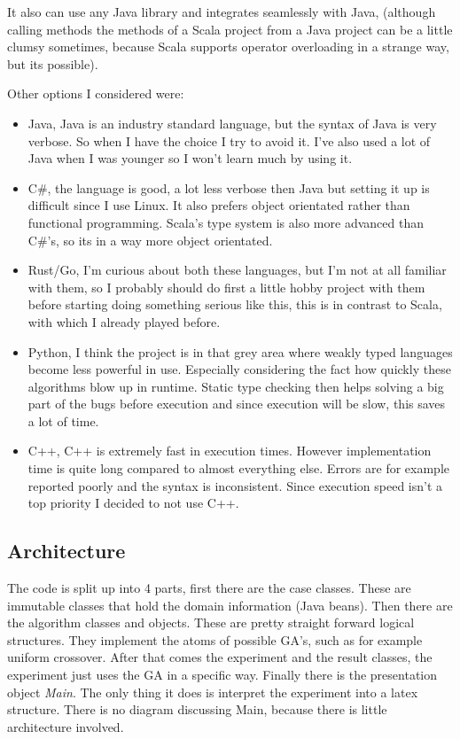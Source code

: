 \documentclass{article}
\begin{document}
\begin{empfile}
It also can use any Java library and integrates seamlessly with Java, (although
calling methods the methods of a Scala project from a Java project can be
a little clumsy sometimes, because Scala supports operator overloading in
a strange way, but its possible).

Other options I considered were:
\begin{itemize}
	\item Java, Java is an industry standard language, but the syntax of
		Java is very verbose. So when I have the choice I try to avoid it.
		I've also used a lot of Java when I was younger so I won't learn
		much by using it.
	\item C\#, the language is good, a lot less verbose then Java
		but setting it up is difficult since I use Linux.
		It also prefers object orientated rather than
		functional programming. Scala's type system is also more advanced than
		C\#'s, so its in a way more object orientated.
	\item Rust/Go, I'm curious about both these languages, but I'm not at
		all familiar with them, so I probably should do first a little
		hobby project with them before starting doing something serious like
		this, this is in contrast to Scala, with which I already played before.
	\item Python, I think the project is in that grey area where weakly
		typed languages become less powerful in use. Especially considering
		the fact how quickly these algorithms blow up in runtime. Static type
		checking then helps solving a big part of the bugs before execution
		and since execution will be slow, this saves a lot of time.
	\item C++, C++ is extremely fast in execution times. However implementation
		time is quite long compared to almost everything else.
		Errors are for example reported poorly and
		the syntax is inconsistent. Since execution speed isn't a top priority
		I decided to not use C++.
\end{itemize}

\subsection{Architecture}
The code is split up into 4 parts, first there are the case classes. These are
immutable classes that hold the domain information (Java beans).
Then there are the algorithm classes and objects. These are pretty straight
forward logical structures. They implement the atoms of possible GA's, such
as for example uniform crossover. After that comes the experiment and the result
classes, the experiment just uses the GA in a specific way.
Finally there is the presentation object \emph{Main}. The only thing it does
is interpret the experiment into a latex structure. There is no
diagram discussing Main, because there is little architecture involved.


\end{empfile}
\end{document}
